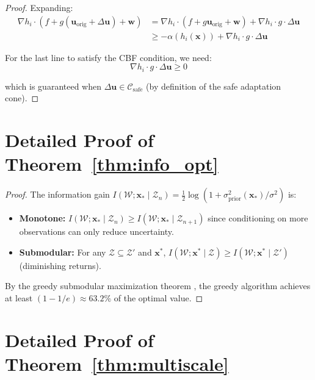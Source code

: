 \documentclass[12pt,a4paper,twocolumn]{article}
\newcommand{\cC}{\mathcal{C}}
\newcommand{\cW}{\mathcal{W}}
\newcommand{\cZ}{\mathcal{Z}}
\newcommand{\vect}[1]{\mathbf{#1}}
\begin{document}
\begin{enumerate}[leftmargin=*]
\begin{proof}
Expanding:
\begin{align}
    \nabla h_i \cdot (f + g(\vect{u}_{\text{orig}} + \Delta\vect{u}) + \vect{w}) &= \nabla h_i \cdot (f + g\vect{u}_{\text{orig}} + \vect{w}) + \nabla h_i \cdot g \cdot \Delta\vect{u} \\
    &\geq -\alpha(h_i(\vect{x})) + \nabla h_i \cdot g \cdot \Delta\vect{u}
\end{align}

For the last line to satisfy the CBF condition, we need:
\begin{equation}
    \nabla h_i \cdot g \cdot \Delta\vect{u} \geq 0
\end{equation}

which is guaranteed when $\Delta\vect{u} \in \cC_{\text{safe}}$ (by definition of the safe adaptation cone).
\end{proof}

\section{Detailed Proof of Theorem~\ref{thm:info_opt}}
\label{app:info_opt_proof}

\begin{proof}
The information gain $I(\cW; \vect{x}_* \mid \cZ_n) = \frac{1}{2}\log(1 + \sigma^2_{\text{prior}}(\vect{x}_*)/\sigma^2)$ is:
\begin{itemize}[leftmargin=*]
    \item \textbf{Monotone:} $I(\cW; \vect{x}_* \mid \cZ_n) \geq I(\cW; \vect{x}_* \mid \cZ_{n+1})$ since conditioning on more observations can only reduce uncertainty.
    \item \textbf{Submodular:} For any $\cZ \subseteq \cZ'$ and $\vect{x}^*$, $I(\cW; \vect{x}^* \mid \cZ) \geq I(\cW; \vect{x}^* \mid \cZ')$ (diminishing returns).
\end{itemize}

By the greedy submodular maximization theorem \citep{Nemhauser1978}, the greedy algorithm achieves at least $(1-1/e) \approx 63.2\%$ of the optimal value.
\end{proof}

\section{Detailed Proof of Theorem~\ref{thm:multiscale}}
\label{app:multiscale_proof}


\end{enumerate}
\end{document}
